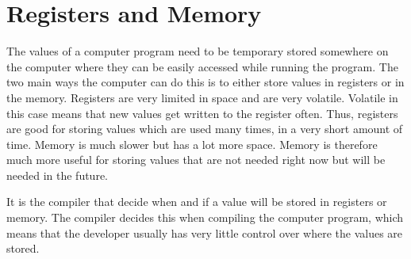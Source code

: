  

\section{Registers and Memory}
\label{sec:regmem}
 

The values of a computer program need to be temporary stored somewhere on the computer where they can be easily accessed while running the program.
The two main ways the computer can do this is to either store values in registers or in the memory.
Registers are very limited in space and are very volatile.
Volatile in this case means that new values get written to the register often.
Thus, registers are good for storing values which are used many times, in a very short amount of time.
Memory is much slower but has a lot more space.
Memory is therefore much more useful for storing values that are not needed right now but will be needed in the future.


It is the compiler that decide when and if a value will be stored in registers or memory.
The compiler decides this when compiling the computer program, which means that the developer usually has very little control over where the values are stored.



